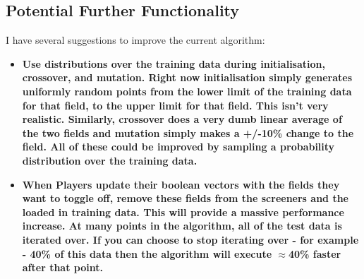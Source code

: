 \subsection{Potential Further Functionality}
I have several suggestions to improve the current algorithm:

\begin{itemize}
    \item \bf Use distributions over the training data during initialisation, crossover, and mutation. \rm Right now initialisation simply generates uniformly random points from the lower limit of the training data for that field, to the upper limit for that field. This isn't very realistic. Similarly, crossover does a very dumb linear average of the two fields and mutation simply makes a +/-10\% change to the field. All of these could be improved by sampling a probability distribution over the training data.
    \item \bf When Players update their boolean vectors with the fields they want to toggle off, remove these fields from the screeners and the loaded in training data. \rm This will provide a massive performance increase. At many points in the algorithm, all of the test data is iterated over. If you can choose to stop iterating over - for example - 40\% of this data then the algorithm will execute $\approx$40\% faster after that point.
\end{itemize}